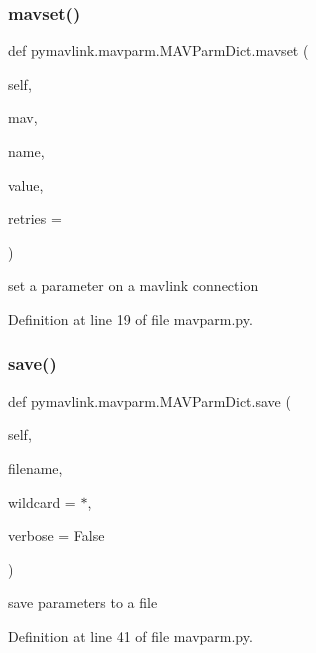 \subsubsection{\texorpdfstring{mavset()}{mavset()}}
{\footnotesize\ttfamily def pymavlink.\+mavparm.\+M\+A\+V\+Parm\+Dict.\+mavset (\begin{DoxyParamCaption}\item[{}]{self,  }\item[{}]{mav,  }\item[{}]{name,  }\item[{}]{value,  }\item[{}]{retries = {} }\end{DoxyParamCaption})}

\begin{DoxyVerb}set a parameter on a mavlink connection\end{DoxyVerb}
 

Definition at line 19 of file mavparm.\+py.

\mbox{\label{classpymavlink_1_1mavparm_1_1MAVParmDict_a0f942689bbd320e3bf8201cb5b343ce0}} 
\subsubsection{\texorpdfstring{save()}{save()}}
{\footnotesize\ttfamily def pymavlink.\+mavparm.\+M\+A\+V\+Parm\+Dict.\+save (\begin{DoxyParamCaption}\item[{}]{self,  }\item[{}]{filename,  }\item[{}]{wildcard = {\ttfamily \textquotesingle{}$\ast$\textquotesingle{}},  }\item[{}]{verbose = {\ttfamily False} }\end{DoxyParamCaption})}

\begin{DoxyVerb}save parameters to a file\end{DoxyVerb}
 

Definition at line 41 of file mavparm.\+py.

\mbox{\label{classpymavlink_1_1mavparm_1_1MAVParmDict_a94a75c918aa0bbb2ef0b2562b9fa554e}} 
